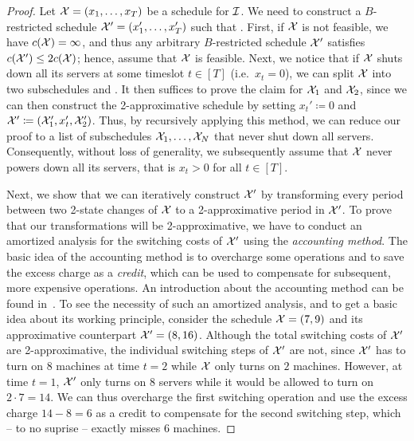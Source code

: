 \begin{proof}
Let $\mathcal{X}=(x_1,\dotsc,x_T)$ be a schedule for $\mathcal{I}$. We need to construct a $B$-restricted schedule $\mathcal{X}'=(x_1',\dotsc,x_T')$ such that .
First, if $\mathcal{X}$ is not feasible, we have $c(\mathcal{X})=\infty$, and thus any arbitrary $B$-restricted schedule $\mathcal{X}'$ satisfies $c(\mathcal{X}')\le2c(\mathcal{X})$; hence, assume that $\mathcal{X}$ is feasible. Next, we notice that if $\mathcal{X}$ shuts down all its servers at some timeslot $t\in[T]$ (i.e.\ $x_t=0$), we can split $\mathcal{X}$ into two subschedules  and . It then suffices to prove the claim for $\mathcal{X}_1$ and $\mathcal{X}_2$, since we can then construct the 2-approximative schedule by setting $x_t'\coloneqq 0$ and $\mathcal{X}'\coloneqq(\mathcal{X}_1',x_t',\mathcal{X}_2')$. Thus, by recursively applying this method, we can reduce our proof to a list of subschedules $\mathcal{X}_1,\dotsc,\mathcal{X}_N$ that never shut down all servers. Consequently, without loss of generality, we subsequently assume that $\mathcal{X}$ never powers down all its servers, that is $x_t>0$ for all $t\in[T]$. 
	
Next, we show that we can iteratively construct $\mathcal{X}'$ by transforming every period between two 2-state changes of $\mathcal{X}$ to a 2-approximative period in $\mathcal{X}'$. 
To prove that our transformations will be 2-approximative, we have to conduct an amortized analysis for the switching costs of $\mathcal{X}'$ using the \emph{accounting method}. The basic idea of the accounting method is to overcharge some operations and to save the excess charge as a \emph{credit}, which can be used to compensate for subsequent, more expensive operations. An introduction about the accounting method can be found in~\parencite[Section~17.2]{intro-algo}. To see the necessity of such an amortized analysis, and to get a basic idea about its working principle, consider the schedule $\mathcal{X}=(7,9)$ and its approximative counterpart $\mathcal{X}'=(8,16)$. Although the total switching costs of $\mathcal{X}'$ are 2-approximative, the individual switching steps of $\mathcal{X}'$ are not, since $\mathcal{X}'$ has to turn on $8$ machines at time $t=2$ while $\mathcal{X}$ only turns on $2$ machines. However, at time $t=1$, $\mathcal{X}'$ only turns on $8$ servers while it would be allowed to turn on $2\cdot7=14$. We can thus overcharge the first switching operation and use the excess charge $14-8=6$ as a credit to compensate for the second switching step, which -- to no suprise -- exactly misses $6$ machines.
	

\end{proof}
